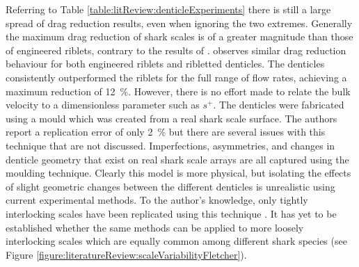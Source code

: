 \documentclass[12pt,oneside,a4paper]{article}
\begin{document}
Referring to Table \ref{table:litReview:denticleExperiments} there is still a large spread of drag reduction results, even when ignoring the two extremes. %
Generally the maximum drag reduction of shark scales is of a greater magnitude than those of engineered riblets, contrary to the results of \cite{bechert1985}. \cite{chen2014} observes similar drag reduction behaviour for both engineered riblets and ribletted denticles.
The denticles consistently outperformed the riblets for the full range of flow rates, achieving a maximum reduction of \SI{12}{\%}. However, there is no effort made to relate the bulk velocity to a dimensionless parameter such as $s^+$. The denticles were fabricated using a mould which was created from a real shark scale surface. The authors report a replication error of only \SI{2}{\%} but there are several issues with this technique that are not discussed. Imperfections, asymmetries, and changes in denticle geometry that exist on real shark scale arrays are all captured using the moulding technique. Clearly this model is more physical, but isolating the effects of slight geometric changes between the different denticles is unrealistic using current experimental methods. To the author's knowledge, only tightly interlocking scales have been replicated using this technique \citep{zhang2011a,zhang2011b, zhao2012, chen2014,luo2015b,luo2015}. It has yet to be established whether the same methods can be applied to more loosely interlocking scales which are equally common among different shark species (see Figure \ref{figure:literatureReview:scaleVariabilityFletcher}).
\end{document}
